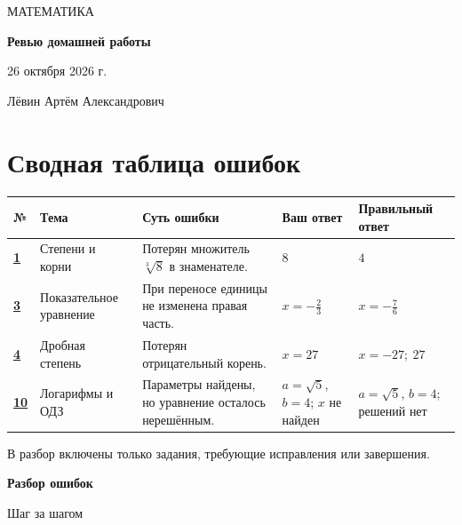 \documentclass[a4paper,12pt]{article}
\begin{document}
\thispagestyle{empty}
\begin{center}
\vspace*{35mm}
{\large\color{accent}МАТЕМАТИКА}\par
\vspace{20mm}
{\fontsize{29}{37}\selectfont\bfseries Ревью домашней работы}\par
\vspace{16mm}
{\Large 26 октября 2026 г.}\par
\vspace{30mm}
{\large Лёвин Артём Александрович}\par
\end{center}
\vfill
\begin{center}
\end{center}
\newpage
\section*{Сводная таблица ошибок}
\vspace{3mm}
\small
\begin{tabularx}{\linewidth}{@{}>{\raggedright\arraybackslash}p{10mm}>{\raggedright\arraybackslash}p{30mm}X>{\raggedright\arraybackslash}p{27mm}>{\raggedright\arraybackslash}p{28mm}@{}}
\toprule
\textbf{№} & \textbf{Тема} & \textbf{Суть ошибки} & \textbf{Ваш ответ} & \textbf{Правильный ответ}\\
\midrule
\hyperref[task:1]{\textbf{1}} & Степени и корни & Потерян множитель $\sqrt[3]{8}$ в знаменателе. & $8$ & $4$\\
\addlinespace[3pt]
\hyperref[task:3]{\textbf{3}} & Показательное уравнение & При переносе единицы не изменена правая часть. & $x=-\frac23$ & $x=-\frac76$\\
\addlinespace[3pt]
\hyperref[task:4]{\textbf{4}} & Дробная степень & Потерян отрицательный корень. & $x=27$ & $x=-27;\ 27$\\
\addlinespace[3pt]
\hyperref[task:10]{\textbf{10}} & Логарифмы и ОДЗ & Параметры найдены, но уравнение осталось нерешённым. & $a=\sqrt5$, $b=4$; $x$ не найден & $a=\sqrt5$, $b=4$; решений нет\\
\bottomrule
\end{tabularx}
\normalsize
\vfill
\begin{center}\small\color{ink!70}В разбор включены только задания, требующие исправления или завершения.\end{center}
\clearpage
\thispagestyle{empty}
\vspace*{0.36\textheight}
\begin{center}
{\fontsize{26}{32}\selectfont\bfseries Разбор ошибок}\par
\vspace{7mm}
{\large\color{accent}Шаг за шагом}\par
\end{center}
\clearpage
\end{document}
